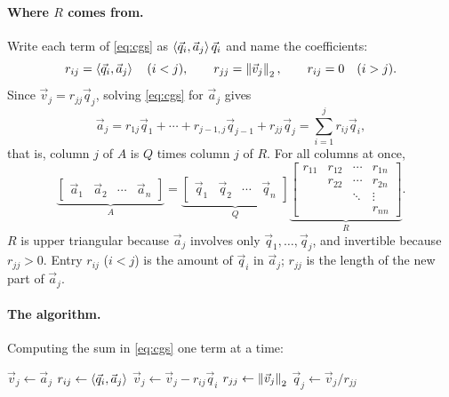 \paragraph{Where $R$ comes from.} Write each term of \eqref{eq:cgs} as $\left\langle \vec{q}_i, \vec{a}_j \right\rangle\vec{q}_i$ and name the coefficients:
\begin{equation}
  r_{ij} = \left\langle \vec{q}_i, \vec{a}_j \right\rangle \quad (i < j), \qquad r_{jj} = \left\lVert \vec{v}_j \right\rVert_2, \qquad r_{ij} = 0 \quad (i > j).
\end{equation}
Since $\vec{v}_j = r_{jj}\vec{q}_j$, solving \eqref{eq:cgs} for $\vec{a}_j$ gives
\begin{equation}
  \vec{a}_j = r_{1j}\vec{q}_1 + \cdots + r_{j-1,j}\vec{q}_{j-1} + r_{jj}\vec{q}_j = \sum_{i=1}^{j} r_{ij}\vec{q}_i,
\end{equation}
that is, column $j$ of $A$ is $Q$ times column $j$ of $R$. For all columns at once,
\begin{equation}
  \underbrace{\begin{bmatrix} \vec{a}_1 & \vec{a}_2 & \cdots & \vec{a}_n \end{bmatrix}}_{A}
  = \underbrace{\begin{bmatrix} \vec{q}_1 & \vec{q}_2 & \cdots & \vec{q}_n \end{bmatrix}}_{Q}
  \underbrace{\begin{bmatrix} r_{11} & r_{12} & \cdots & r_{1n} \\ & r_{22} & \cdots & r_{2n} \\ & & \ddots & \vdots \\ & & & r_{nn} \end{bmatrix}}_{R}.
\end{equation}
$R$ is upper triangular because $\vec{a}_j$ involves only $\vec{q}_1, \dots, \vec{q}_j$, and invertible because $r_{jj} > 0$. Entry $r_{ij}$ ($i < j$) is the amount of $\vec{q}_i$ in $\vec{a}_j$; $r_{jj}$ is the length of the new part of $\vec{a}_j$.

\paragraph{The algorithm.} Computing the sum in \eqref{eq:cgs} one term at a time:
\begin{algorithm}[H]
  \caption{Classical Gram--Schmidt (CGS).}
  \label{alg:cgs}
  \begin{algorithmic}[1]
      \State $\vec{v}_j \gets \vec{a}_j$
        \State $r_{ij} \gets \left\langle \vec{q}_i, \vec{a}_j \right\rangle$ 
        \State $\vec{v}_j \gets \vec{v}_j - r_{ij}\vec{q}_i$
      \EndFor
      \State $r_{jj} \gets \left\lVert \vec{v}_j \right\rVert_2$
      \State $\vec{q}_j \gets \vec{v}_j / r_{jj}$
    \EndFor
  \end{algorithmic}
\end{algorithm}

